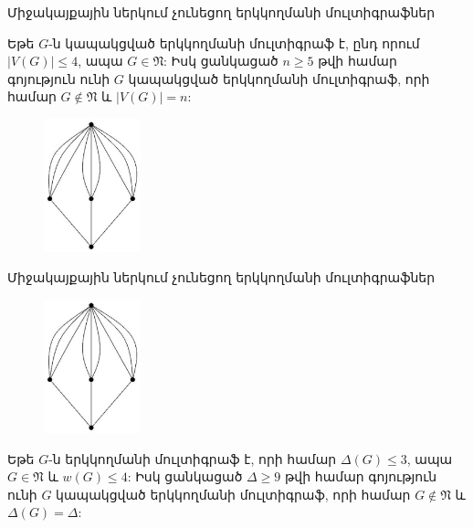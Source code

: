 \begin{frame}{Միջակայքային ներկում չունեցող երկկողմանի մուլտիգրաֆներ}
\begin{theorem}[3.5.3]
Եթե $G$-ն կապակցված երկկողմանի մուլտիգրաֆ է, ընդ որում $\vert V(G)\vert\leq 4$, ապա $G\in \mathfrak{N}$: Իսկ ցանկացած $n \geq 5$ թվի համար գոյություն ունի $G$ կապակցված երկկողմանի մուլտիգրաֆ, որի համար $G\notin \mathfrak{N}$ և $|V(G)|=n$:
\end{theorem}

\begin{figure}[h]
\begin{center}
\includegraphics[width=0.25\textwidth]{figures/parachute.eps}
\end{center}
\end{figure}
\end{frame}

\begin{frame}{Միջակայքային ներկում չունեցող երկկողմանի մուլտիգրաֆներ}


\begin{figure}[h]
\begin{center}
\includegraphics[width=0.25\textwidth]{figures/parachute.eps}
\end{center}
\end{figure}

\begin{theorem}[3.5.4]
Եթե $G$-ն երկկողմանի մուլտիգրաֆ է, որի համար
$\Delta(G)\leq 3$, ապա $G\in \mathfrak{N}$ և $w(G)\leq 4$: Իսկ ցանկացած $\Delta \geq 9$ թվի համար գոյություն ունի $G$ կապակցված երկկողմանի մուլտիգրաֆ, որի համար $G\notin \mathfrak{N}$ և $\Delta(G)=\Delta$:
\end{theorem}

\end{frame}